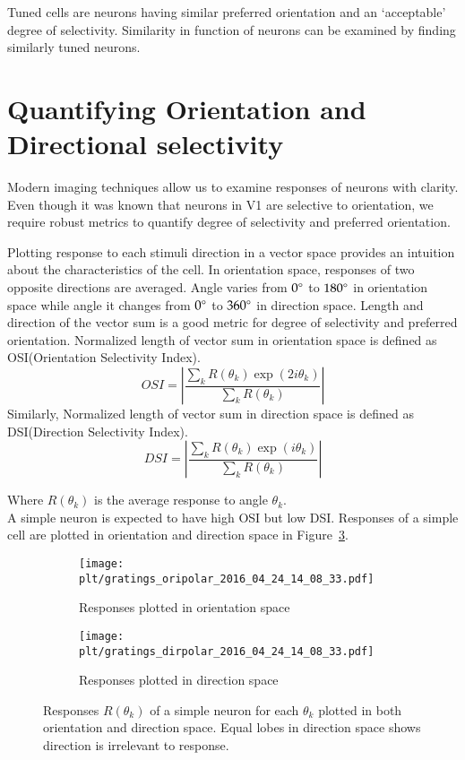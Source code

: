 \documentclass[MTech]{iitmdiss}
\newcommand{\plt}{thesis_plots}
\begin{document}
Tuned cells are neurons having similar preferred orientation and an `acceptable' degree of selectivity. Similarity in function of neurons can be examined by finding similarly tuned neurons. 
\section{Quantifying Orientation and Directional selectivity} %
\label{sec:quantifying_orientation_and_directional_selectivity}
Modern imaging techniques allow us to examine responses of neurons with clarity. Even though it was known that neurons in V1 are selective to orientation, we require robust metrics to quantify degree of selectivity and preferred orientation.

Plotting response to each stimuli direction in a vector space provides an intuition about the characteristics of the cell. In orientation space, responses of two opposite directions are averaged. Angle varies from $0\degree$ to $180\degree$ in orientation space while angle it changes from $0\degree$ to $360\degree$ in direction space. Length and direction of the vector sum is a good metric for degree of selectivity and preferred orientation. Normalized length of vector sum in orientation space is defined as OSI(Orientation Selectivity Index).
$$OSI = \left|\frac{\sum_{k} R(\theta_k) \exp(2i\theta_k)}{\sum_{k} R(\theta_k)}\right|$$
Similarly, Normalized length of vector sum in direction space is defined as DSI(Direction Selectivity Index).
$$DSI = \left|\frac{\sum_{k} R(\theta_k) \exp(i\theta_k)}{\sum_{k} R(\theta_k)}\right|$$

Where $R(\theta_k)$ is the average response to angle $\theta_k$.\\
A simple neuron is expected to have high OSI but low DSI. Responses of a simple cell are plotted in orientation and direction space in Figure~\ref{fig:oridir_simple}.
\begin{figure}[h]
  \begin{subfigure}[b]{0.5\textwidth}
    \texttt{[image: \\plt/gratings\_oripolar\_2016\_04\_24\_14\_08\_33.pdf]}
    \caption{Responses plotted in orientation space}
    \label{fig:ori_simple}
  \end{subfigure}%
  \begin{subfigure}[b]{0.5\textwidth}
    \texttt{[image: \\plt/gratings\_dirpolar\_2016\_04\_24\_14\_08\_33.pdf]}
    \caption{Responses plotted in direction space}
    \label{fig:dir_simple}
  \end{subfigure}%
  \caption{Responses $R(\theta_k)$ of a simple neuron for each $\theta_k$ plotted in both orientation and direction space. Equal lobes in direction space shows direction is irrelevant to response.}\label{fig:oridir_simple}
\end{figure}
\end{document}
